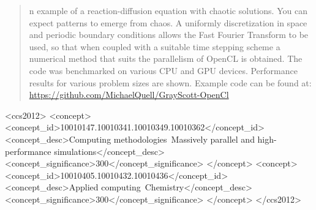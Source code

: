\documentclass{sig-alternate-05-2015}
\begin{document}
%
\author{
%
%
\alignauthor
Michael Quell\\
       \\
       \\
       \\
}
\maketitle
\begin{abstract}
n example of a reaction-diffusion equation with chaotic solutions. You can expect patterns to emerge from chaos. A uniformly discretization in space and periodic boundary conditions allows the Fast Fourier Transform to be used, so that when coupled with a suitable time stepping scheme a numerical method that suits the parallelism of OpenCL is obtained. The code was benchmarked on various CPU and GPU devices. Performance results for various problem sizes are shown. Example code can be found at:\\
\url{https://github.com/MichaelQuell/GrayScott-OpenCl}
\end{abstract}


%
%
 \begin{CCSXML}
<ccs2012>
<concept>
<concept_id>10010147.10010341.10010349.10010362</concept_id>
<concept_desc>Computing methodologies~Massively parallel and high-performance simulations</concept_desc>
<concept_significance>300</concept_significance>
</concept>
<concept>
<concept_id>10010405.10010432.10010436</concept_id>
<concept_desc>Applied computing~Chemistry</concept_desc>
<concept_significance>300</concept_significance>
</concept>
</ccs2012>
\end{CCSXML}
\end{document}
